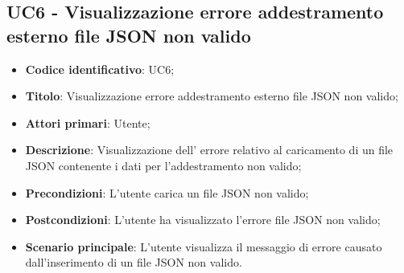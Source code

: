 \subsection{UC6 - Visualizzazione errore addestramento esterno file JSON non valido}
\begin{itemize}
	\item \textbf{Codice identificativo}: UC6;
	\item \textbf{Titolo}: Visualizzazione errore addestramento esterno file JSON non valido;
	\item \textbf{Attori primari}: Utente;
	\item \textbf{Descrizione}: Visualizzazione dell' errore relativo al caricamento di un file JSON contenente i dati per l'addestramento non valido;
	\item \textbf{Precondizioni}: L'utente carica un file JSON non valido;
	\item \textbf{Postcondizioni}: L'utente ha visualizzato l'errore file JSON non valido;	
	\item \textbf{Scenario principale}: L'utente visualizza il messaggio di errore causato dall'inserimento di un file JSON non valido.	
\end{itemize}
